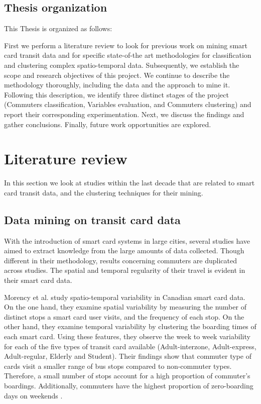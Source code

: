\documentclass{article}
\begin{document}
\subsection{Thesis organization}
This Thesis is organized as follows:

First we perform a literature review to look for previous work on mining smart card transit data and for specific state-of-the art methodologies for classification and clustering complex spatio-temporal data. Subsequently, we establish the scope and research objectives of this project. We continue to describe the methodology thoroughly, including the data and the approach to mine it. Following this description, we identify three distinct stages of the project (Commuters classification, Variables evaluation, and Commuters clustering) and report their corresponding experimentation. Next, we discuss the findings and gather conclusions. Finally, future work opportunities are explored. 


\newpage
\section{Literature review}
In this section we look at studies within the last decade that are related to smart card transit data, and the clustering techniques for their mining. 

\subsection{Data mining on transit card data}
With the introduction of smart card systems in large cities, several studies have aimed to extract knowledge from the large amounts of data collected. Though different in their methodology, results concerning commuters are duplicated across studies. The spatial and temporal regularity of their travel is evident in their smart card data.


Morency et al. study spatio-temporal variability in Canadian smart card data. On the one hand, they examine spatial variability by measuring the number of distinct stops a smart card user visits, and the frequency of each stop. On the other hand, they examine temporal variability by clustering the boarding times of each smart card. Using these features, they observe the week to week variability for each of the five types of transit card available (Adult-interzone, Adult-express, Adult-regular, Elderly and Student). Their findings show that commuter type of cards visit a smaller range of bus stops compared to non-commuter types. Therefore, a small number of stops account for a high proportion of commuter's boardings. Additionally, commuters have the highest proportion of zero-boarding days on weekends \cite{morency2007measuring}.
\end{document}
